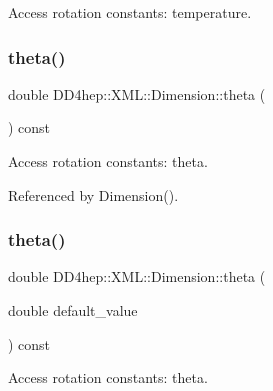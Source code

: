 Access rotation constants\+: temperature. 

\hypertarget{struct_d_d4hep_1_1_x_m_l_1_1_dimension_a34223fdf2b6de29e9de4767f5dc8c6a9}{}\label{struct_d_d4hep_1_1_x_m_l_1_1_dimension_a34223fdf2b6de29e9de4767f5dc8c6a9} 
\subsubsection{\texorpdfstring{theta()}{theta()}\hspace{0.1cm}{\footnotesize\ttfamily [1/2]}}
{\footnotesize\ttfamily double D\+D4hep\+::\+X\+M\+L\+::\+Dimension\+::theta (\begin{DoxyParamCaption}{ }\end{DoxyParamCaption}) const}



Access rotation constants\+: theta. 



Referenced by Dimension().

\hypertarget{struct_d_d4hep_1_1_x_m_l_1_1_dimension_a84106d2e0e05a29b8803a49e7c3dee97}{}\label{struct_d_d4hep_1_1_x_m_l_1_1_dimension_a84106d2e0e05a29b8803a49e7c3dee97} 
\subsubsection{\texorpdfstring{theta()}{theta()}\hspace{0.1cm}{\footnotesize\ttfamily [2/2]}}
{\footnotesize\ttfamily double D\+D4hep\+::\+X\+M\+L\+::\+Dimension\+::theta (\begin{DoxyParamCaption}\item[{double}]{default\+\_\+value }\end{DoxyParamCaption}) const}



Access rotation constants\+: theta. 

\hypertarget{struct_d_d4hep_1_1_x_m_l_1_1_dimension_a92b90fa35c34df20c9285472e1bea8eb}{}\label{struct_d_d4hep_1_1_x_m_l_1_1_dimension_a92b90fa35c34df20c9285472e1bea8eb} 
